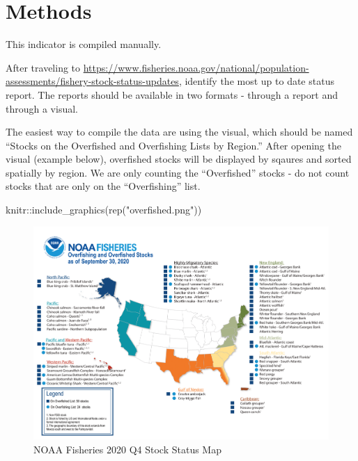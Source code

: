 \documentclass[
]{book}
\newenvironment{Shaded}{\begin{snugshade}}{\end{snugshade}}
\newcommand{\FunctionTok}[1]{\textcolor[rgb]{0.00,0.00,0.00}{#1}}
\newcommand{\NormalTok}[1]{#1}
\newcommand{\SpecialCharTok}[1]{\textcolor[rgb]{0.00,0.00,0.00}{#1}}
\newcommand{\StringTok}[1]{\textcolor[rgb]{0.31,0.60,0.02}{#1}}
\begin{document}
\hypertarget{methods-4}{%
\section{Methods}\label{methods-4}}

This indicator is compiled manually.

After traveling to \url{https://www.fisheries.noaa.gov/national/population-assessments/fishery-stock-status-updates}, identify the most up to date status report. The reports should be available in two formats - through a report and through a visual.

The easiest way to compile the data are using the visual, which should be named ``Stocks on the Overfished and Overfishing Lists by Region.'' After opening the visual (example below), overfished stocks will be displayed by sqaures and sorted spatially by region. We are only counting the ``Overfished'' stocks - do not count stocks that are only on the ``Overfishing'' list.

\begin{Shaded}
\begin{Highlighting}[]
\NormalTok{knitr}\SpecialCharTok{::}\FunctionTok{include\_graphics}\NormalTok{(}\FunctionTok{rep}\NormalTok{(}\StringTok{"overfished.png"}\NormalTok{))}
\end{Highlighting}
\end{Shaded}

\begin{figure}
\includegraphics[width=38.39in]{overfished} \caption{NOAA Fisheries 2020 Q4 Stock Status Map}\label{fig:unnamed-chunk-5}
\end{figure}
\end{document}
